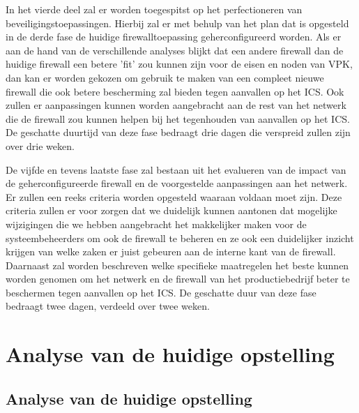 In het vierde deel zal er worden toegespitst op het perfectioneren van beveiligingstoepassingen. Hierbij zal er met behulp van het plan dat is opgesteld in de derde fase de huidige firewalltoepassing geherconfigureerd worden. Als er aan de hand van de verschillende analyses blijkt dat een andere firewall dan de huidige firewall een betere 'fit' zou kunnen zijn voor de eisen en noden van VPK, dan kan er worden gekozen om gebruik te maken van een compleet nieuwe firewall die ook betere bescherming zal bieden tegen aanvallen op het ICS. Ook zullen er aanpassingen kunnen worden aangebracht aan de rest van het netwerk die de firewall zou kunnen helpen bij het tegenhouden van aanvallen op het ICS. De geschatte duurtijd van deze fase bedraagt drie dagen die verspreid zullen zijn over drie weken.

De vijfde en tevens laatste fase zal bestaan uit het evalueren van de impact van de geherconfigureerde firewall en de voorgestelde aanpassingen aan het netwerk. Er zullen een reeks criteria worden opgesteld waaraan voldaan moet zijn. Deze criteria zullen er voor zorgen dat we duidelijk kunnen aantonen dat mogelijke wijzigingen die we hebben aangebracht het makkelijker maken voor de systeembeheerders om ook de firewall te beheren en ze ook een duidelijker inzicht krijgen van welke zaken er juist gebeuren aan de interne kant van de firewall. Daarnaast zal worden beschreven welke specifieke maatregelen het beste kunnen worden genomen om het netwerk en de firewall van het productiebedrijf beter te beschermen tegen aanvallen op het ICS. De geschatte duur van deze fase bedraagt twee dagen, verdeeld over twee weken.  

\chapter{Analyse van de huidige opstelling}

\label{ch:onderzoek}

\section{Analyse van de huidige opstelling}

